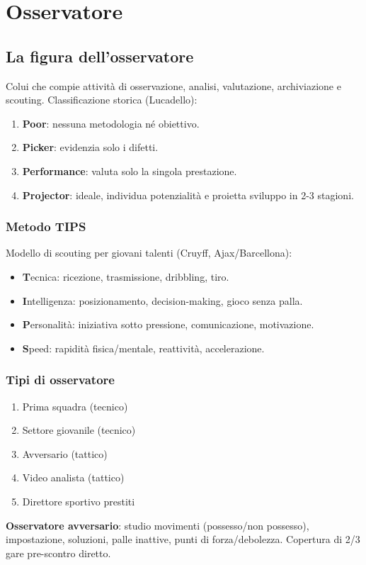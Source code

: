 \documentclass[a4paper,11pt]{article}
\begin{document}
\newpage
\section{Osservatore}
\subsection{La figura dell'osservatore}
Colui che compie attività di osservazione, analisi, valutazione, archiviazione e scouting. Classificazione storica (Lucadello):
\begin{enumerate}
    \item \textbf{Poor}: nessuna metodologia né obiettivo.
    \item \textbf{Picker}: evidenzia solo i difetti.
    \item \textbf{Performance}: valuta solo la singola prestazione.
    \item \textbf{Projector}: ideale, individua potenzialità e proietta sviluppo in 2-3 stagioni.
\end{enumerate}

\subsubsection{Metodo TIPS}
Modello di scouting per giovani talenti (Cruyff, Ajax/Barcellona):
\begin{itemize}
    \item \textbf{T}ecnica: ricezione, trasmissione, dribbling, tiro.
    \item \textbf{I}ntelligenza: posizionamento, decision-making, gioco senza palla.
    \item \textbf{P}ersonalità: iniziativa sotto pressione, comunicazione, motivazione.
    \item \textbf{S}peed: rapidità fisica/mentale, reattività, accelerazione.
\end{itemize}

\subsubsection{Tipi di osservatore}
\begin{enumerate}
    \item Prima squadra (tecnico)
    \item Settore giovanile (tecnico)
    \item Avversario (tattico)
    \item Video analista (tattico)
    \item Direttore sportivo prestiti
\end{enumerate}
\textbf{Osservatore avversario}: studio movimenti (possesso/non possesso), impostazione, soluzioni, palle inattive, punti di forza/debolezza. Copertura di 2/3 gare pre-scontro diretto.
\end{document}

